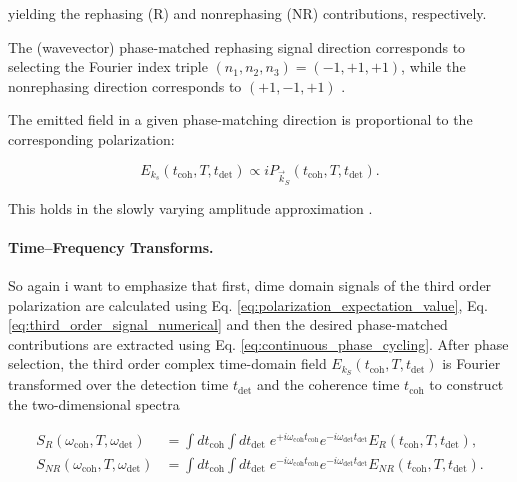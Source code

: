 \noindent 
yielding the rephasing (R) and nonrephasing (NR) contributions, respectively.

\noindent 
The (wavevector) phase-matched rephasing signal direction corresponds to selecting the Fourier index triple $(n_1,n_2,n_3)=(-1,+1,+1)$, while the nonrephasing direction corresponds to $(+1,-1,+1)$ \cite{mukamel1995principlesnonlinearoptical, cho2009twodimensionalopticalspectroscopy, greenetal2024vibrationalcoherenceshalfbroadband}.

\noindent 
The emitted field in a given phase-matching direction is proportional to the corresponding polarization\cite{jonas2003twodimensionalfemtosecondspectroscopy}:

\begin{equation}
	E_{k_s}(t_{\text{coh}},T,t_{\text{det}}) \propto i P_{\vec{k}_S}(t_{\text{coh}},T,t_{\text{det}}).
	\label{eq:field_polarization_relation}
\end{equation}

This holds in the slowly varying amplitude approximation \cite{mukamel1995principlesnonlinearoptical}.


\paragraph{Time--Frequency Transforms.}

\noindent 
So again i want to emphasize that first, dime domain signals of the third order polarization are calculated using Eq. \eqref{eq:polarization_expectation_value}, Eq. \eqref{eq:third_order_signal_numerical} and then the desired phase-matched contributions are extracted using Eq. \eqref{eq:continuous_phase_cycling}. 
After phase selection, the third order complex time-domain field $E_{k_S}(t_{\text{coh}}, T, t_{\text{det}})$ is Fourier transformed over the detection time $t_{\text{det}}$ and the coherence time $t_{\text{coh}}$ to construct the two-dimensional spectra %

\begin{align}
	S_{R}(\omega_{\text{coh}}, T, \omega_{\text{det}})
	 & =
	\int dt_{\text{coh}} \int dt_{\text{det}} \;
	e^{+ i \omega_{\text{coh}} t_{\text{coh}}} e^{- i \omega_{\text{det}} t_{\text{det}}}
	E_{R}(t_{\text{coh}}, T, t_{\text{det}}),
	\label{eq:rephasing_transform} \\
	S_{NR}(\omega_{\text{coh}}, T, \omega_{\text{det}})
	 & =
	\int dt_{\text{coh}} \int dt_{\text{det}} \;
	e^{- i \omega_{\text{coh}} t_{\text{coh}}} e^{- i \omega_{\text{det}} t_{\text{det}}}
	E_{NR}(t_{\text{coh}}, T, t_{\text{det}}).
	\label{eq:nonrephasing_transform}
\end{align}

